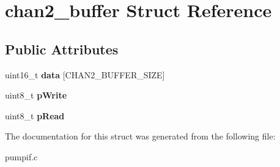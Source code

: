 \hypertarget{structchan2__buffer}{\section{chan2\-\_\-buffer Struct Reference}
\label{structchan2__buffer}
}
\subsection*{Public Attributes}
\begin{DoxyCompactItemize}
\item 
\hypertarget{structchan2__buffer_aa91a07a64236703ec7df5e024f35cff8}{uint16\-\_\-t {\bfseries data} \mbox{[}C\-H\-A\-N2\-\_\-\-B\-U\-F\-F\-E\-R\-\_\-\-S\-I\-Z\-E\mbox{]}}\label{structchan2__buffer_aa91a07a64236703ec7df5e024f35cff8}

\item 
\hypertarget{structchan2__buffer_a15e87b10f68338bac990a140fa19defe}{uint8\-\_\-t {\bfseries p\-Write}}\label{structchan2__buffer_a15e87b10f68338bac990a140fa19defe}

\item 
\hypertarget{structchan2__buffer_ae5e2db469880766ffba1681f9b3d82f7}{uint8\-\_\-t {\bfseries p\-Read}}\label{structchan2__buffer_ae5e2db469880766ffba1681f9b3d82f7}

\end{DoxyCompactItemize}


The documentation for this struct was generated from the following file\-:\begin{DoxyCompactItemize}
\item 
pumpif.\-c\end{DoxyCompactItemize}
